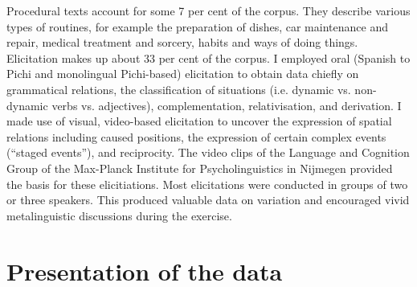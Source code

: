 Procedural texts account for some 7 per cent of the corpus. They describe various types of routines, for example the preparation of dishes, car maintenance and repair, medical treatment and sorcery, habits and ways of doing things. Elicitation makes up about 33 per cent of the corpus. I employed oral (Spanish to Pichi and monolingual Pichi-based) elicitation to obtain data chiefly on grammatical relations, the classification of situations (i.e. dynamic vs. non-dynamic verbs vs. adjectives), complementation, relativisation, and derivation. I made use of visual, video-based elicitation to uncover the expression of spatial relations including caused positions, the expression of certain complex events (“staged events”), and reciprocity. The video clips of the Language and Cognition Group of the Max-Planck Institute for Psycholinguistics in Nijmegen provided the basis for these elicitiations. Most elicitations were conducted in groups of two or three speakers. This produced valuable data on variation and encouraged vivid metalinguistic discussions during the exercise. 

\section{Presentation of the data}\label{sec:1.8}
% 

